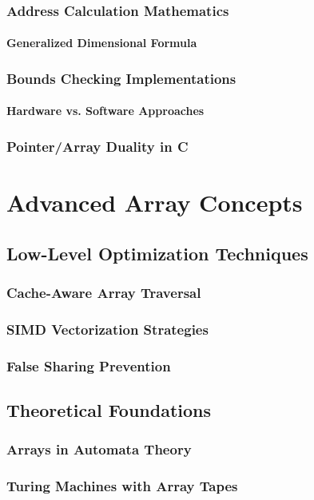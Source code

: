 \documentclass[12pt, oneside]{book}
\begin{document}
	 \section{Address Calculation Mathematics}
	 \subsection{Generalized Dimensional Formula}
	 \section{Bounds Checking Implementations}
	 \subsection{Hardware vs. Software Approaches}
	 \section{Pointer/Array Duality in C}
	 
	 \part{Advanced Array Concepts}
	 \chapter{Low-Level Optimization Techniques}
	 \section{Cache-Aware Array Traversal}
	 \section{SIMD Vectorization Strategies}
	 \section{False Sharing Prevention}
	 
	 \chapter{Theoretical Foundations}
	 \section{Arrays in Automata Theory}
	 \section{Turing Machines with Array Tapes}
\end{document}

